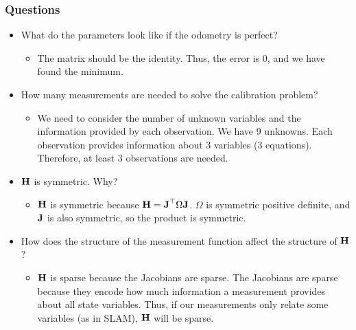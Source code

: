 \begin{frame}
    \frametitle{Questions}
    
    \begin{itemize}
        \item<1-> What do the parameters look like if the odometry is perfect?
        \begin{itemize}
            \item<2-> The matrix should be the identity. Thus, the error is 0, and we have found the minimum.
        \end{itemize}
        \item<3-> How many measurements are needed to solve the calibration problem?
        \begin{itemize}
            \item<4-> We need to consider the number of unknown variables and the information provided by each observation. We have 9 unknowns. Each observation provides information about 3 variables (3 equations). Therefore, at least 3 observations are needed.
        \end{itemize}
        \item<5-> $\boldsymbol{\mathbf{H}}$ is symmetric. Why?
        \begin{itemize}
            \item<6-> $\boldsymbol{\mathbf{H}}$ is symmetric because $\boldsymbol{\mathbf{H}} = \boldsymbol{\mathbf{J}}^{\top}\Omega\boldsymbol{\mathbf{J}}$. $\Omega$ is symmetric positive definite, and $\boldsymbol{\mathbf{J}}$ is also symmetric, so the product is symmetric.
        \end{itemize}
        \item<7-> How does the structure of the measurement function affect the structure of $\boldsymbol{\mathbf{H}}$?
        \begin{itemize}
            \item<8-> $\boldsymbol{\mathbf{H}}$ is sparse because the Jacobians are sparse. The Jacobians are sparse because they encode how much information a measurement provides about all state variables. Thus, if our measurements only relate some variables (as in SLAM), $\boldsymbol{\mathbf{H}}$ will be sparse.
        \end{itemize}
    \end{itemize}

\end{frame}


